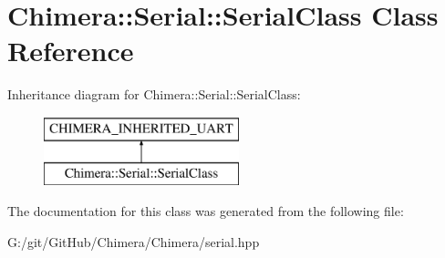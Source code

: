 \hypertarget{class_chimera_1_1_serial_1_1_serial_class}{}\section{Chimera\+:\+:Serial\+:\+:Serial\+Class Class Reference}
\label{class_chimera_1_1_serial_1_1_serial_class}
Inheritance diagram for Chimera\+:\+:Serial\+:\+:Serial\+Class\+:\begin{figure}[H]
\begin{center}
\leavevmode
\includegraphics[height=2.000000cm]{class_chimera_1_1_serial_1_1_serial_class}
\end{center}
\end{figure}


The documentation for this class was generated from the following file\+:\begin{DoxyCompactItemize}
\item 
G\+:/git/\+Git\+Hub/\+Chimera/\+Chimera/serial.\+hpp\end{DoxyCompactItemize}
